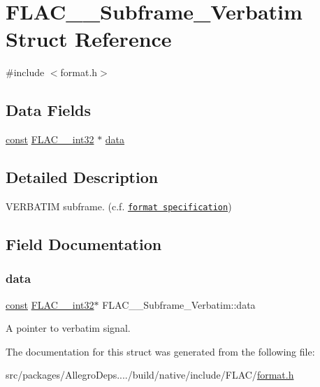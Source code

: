 \hypertarget{struct_f_l_a_c_____subframe___verbatim}{}\section{F\+L\+A\+C\+\_\+\+\_\+\+Subframe\+\_\+\+Verbatim Struct Reference}
\label{struct_f_l_a_c_____subframe___verbatim}


{\ttfamily \#include $<$format.\+h$>$}

\subsection*{Data Fields}
\begin{DoxyCompactItemize}
\item 
\hyperlink{zconf_8h_a2c212835823e3c54a8ab6d95c652660e}{const} \hyperlink{ordinals_8h_a33fd77bfe6d685541a0c034a75deccdc}{F\+L\+A\+C\+\_\+\+\_\+int32} $\ast$ \hyperlink{struct_f_l_a_c_____subframe___verbatim_a6abc78689650804550ac517ada884584}{data}
\end{DoxyCompactItemize}


\subsection{Detailed Description}
V\+E\+R\+B\+A\+T\+IM subframe. (c.\+f. \href{../format.html#subframe_verbatim}{\tt format specification}) 

\subsection{Field Documentation}
\mbox{\label{struct_f_l_a_c_____subframe___verbatim_a6abc78689650804550ac517ada884584}} 
\subsubsection{\texorpdfstring{data}{data}}
{\footnotesize\ttfamily \hyperlink{zconf_8h_a2c212835823e3c54a8ab6d95c652660e}{const} \hyperlink{ordinals_8h_a33fd77bfe6d685541a0c034a75deccdc}{F\+L\+A\+C\+\_\+\+\_\+int32}$\ast$ F\+L\+A\+C\+\_\+\+\_\+\+Subframe\+\_\+\+Verbatim\+::data}

A pointer to verbatim signal. 

The documentation for this struct was generated from the following file\+:\begin{DoxyCompactItemize}
\item 
src/packages/\+Allegro\+Deps..../build/native/include/\+F\+L\+A\+C/\hyperlink{format_8h}{format.\+h}\end{DoxyCompactItemize}
